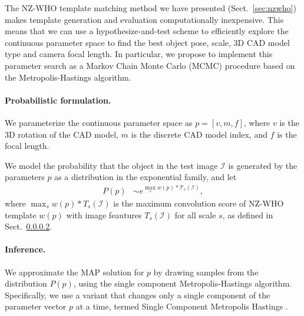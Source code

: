 The NZ-WHO template matching method we have presented
(Sect.~\ref{sec:nzwho}) makes template generation and evaluation
computationally inexpensive. This means that we can use a
hypothesize-and-test scheme to efficiently explore the continuous
parameter space to find the best object pose, scale, 3D CAD model type
and camera focal length.
%
In particular, we propose to implement this parameter search as a
Markov Chain Monte Carlo (MCMC) procedure based on the
Metropolis-Hastings algorithm.

\paragraph{Probabilistic formulation.}
We parameterize the continuous parameter space as  $p = [v, m, f]$,
where $v$ is the 3D rotation of the CAD model, $m$ is the discrete CAD
model index, and $f$ is the focal length.

We model the probability that the object in the test image
$\mathcal{I}$ is generated by the parameters $p$ as a distribution in
the exponential family, and let
\begin{align}
    P(p) & \sim e^{ \max_{s} w(p) \ast \mathcal{T}_s(\mathcal{I})},
\end{align}
where $\max_{s} w(p) \ast T_s(\mathcal{I})$ is the maximum convolution score of
NZ-WHO template $w(p)$ with image feautures $T_s(\mathcal{I})$ for all scale $s$, as defined
in Sect.~\ref{}. 

\paragraph{Inference.}
We approximate the MAP solution for $p$ by drawing samples from the
distribution $P(p)$, using the single component Metropolis-Hastings
algorithm. Specifically, we use a variant that changes only a single
component of the parameter vector $p$ at a time, termed Single
Component Metropolis Hastings \cite{mcmc}.

